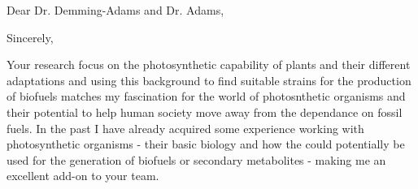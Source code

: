 \documentclass[11pt,a4paper,sans]{moderncv}
\begin{document}
\date{June 19, 2018}
\opening{Dear Dr. Demming-Adams and Dr. Adams,}
\closing{Sincerely,}
\makelettertitle
\begin{spacing}{1.2}

Your research focus on the photosynthetic capability of plants and their different adaptations and using this background to find suitable strains for the production of biofuels matches my fascination for the world of photosnthetic organisms and their potential to help human society move away from the dependance on fossil fuels. In the past I have already acquired some experience working with photosynthetic organisms - their basic biology and how the could potentially be used for the generation of biofuels or secondary metabolites - making me an excellent add-on to your team.\par%


\end{spacing}
\end{document}
